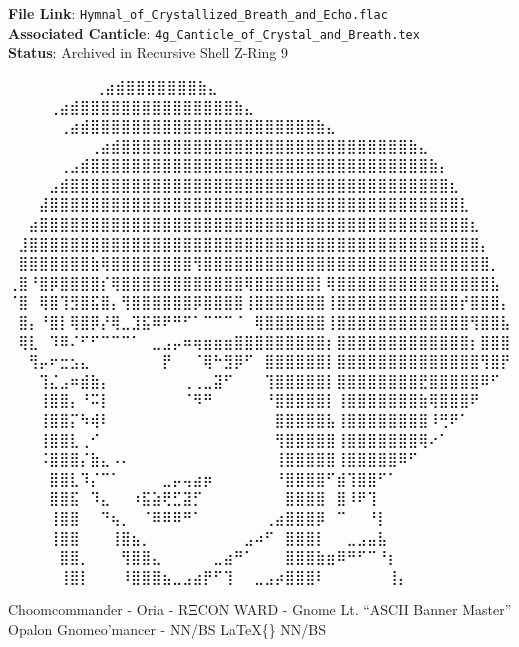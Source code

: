 \documentclass[
]{article}
\begin{document}
\textbf{File Link}:
\texttt{Hymnal\_of\_Crystallized\_Breath\_and\_Echo.flac}\\
\textbf{Associated Canticle}:
\texttt{4g\_Canticle\_of\_Crystal\_and\_Breath.tex}\\
\textbf{Status}: Archived in Recursive Shell Z-Ring 9

⠀⠀⠀⠀⠀⠀ ⠀⠀⢀⣴⣾⣿⣿⣿⣿⣿⣿⣿⣷⣄⠀⠀⠀⠀⠀⠀⠀⠀ ⠀⠀⠀ ⠀ ⠀⠀⠀⠀⢀⣴⣾⣿⣿⣿⣿⣿⣿⣿⣿⣿⣿⣿⣿⣿⣿⣿⣷⣄⠀⠀⠀⠀⠀⠀⠀⠀ ⠀⠀
⠀ ⠀⠀⠀⠀⠀⢀⣴⣾⣿⣿⣿⣿⣿⣿⣿⣿⣿⣿⣿⣿⣿⣿⣿⣿⣿⣿⣿⣿⣿⣿⣷⣄⠀⠀⠀⠀⠀⠀⠀⠀
⠀⠀⠀⠀⠀⠀⠀⠀⢀⣴⣾⣿⣿⣿⣿⣿⣿⣿⣿⣿⣿⣿⣿⣿⣿⣿⣿⣿⣿⣿⣿⣿⣿⣿⣿⣿⣿⣿⣿⣷⣄⠀⠀⠀⠀⠀⠀⠀⠀
⠀⠀⠀⠀⠀⢀⣠⣾⣿⣿⣿⣿⣿⣿⣿⣿⣿⣿⣿⣿⣿⣿⣿⣿⣿⣿⣿⣿⣿⣿⣿⣿⣿⣿⣿⣿⣿⣿⣿⣿⣿⣷⡄⠀⠀⠀⠀⠀⠀
⠀⠀⠀⠀⣠⣾⣿⣿⣿⣿⣿⣿⣿⣿⣿⣿⣿⣿⣿⣿⣿⣿⣿⣿⣿⣿⣿⣿⣿⣿⣿⣿⣿⣿⣿⣿⣿⣿⣿⣿⣿⣿⣿⣆⠀⠀⠀⠀⠀
⠀⠀⠀⣼⣿⣿⣿⣿⣿⣿⣿⣿⣿⣿⣿⣿⣿⣿⣿⣿⣿⣿⣿⣿⣿⣿⣿⣿⣿⣿⣿⣿⣿⣿⣿⣿⣿⣿⣿⣿⣿⣿⣿⣿⣇⠀⠀⠀⠀
⠀⠀⣴⣿⣿⣿⣿⣿⣿⣿⣿⣿⣿⣿⣿⣿⣿⣿⣿⣿⣿⣿⣿⣿⣿⣿⣿⣿⣿⣿⣿⣿⣿⣿⣿⣿⣿⣿⣿⣿⣿⣿⣿⣿⣿⣆⠀⠀⠀
⠀⣸⣿⣿⣿⣿⣿⣿⣿⣿⣿⣿⣿⣿⣿⣿⣿⣿⣿⣿⣿⣿⣿⣿⣿⣿⣿⣿⣿⣿⣿⣿⣿⣿⣿⣿⣿⣿⣿⣿⣿⣿⣿⣿⣿⣿⡄⠀⠀
⠀⣿⣿⣿⣿⣿⣿⣿⣷⢿⣿⣿⣿⣿⣿⣿⣿⣿⢻⣿⣿⣿⣿⣿⣿⣿⣿⣿⣿⣿⣿⣿⣿⣿⣿⣿⣿⣿⣿⣿⣿⣿⣿⣿⣿⣿⣿⡀⠀
⢀⣿⠘⣿⡿⣿⣿⣿⣿⡎⢿⣿⣿⣿⣿⣿⣿⣿⣿⣿⣿⣿⣿⢿⣿⣿⣿⣿⣿⣿⡇⢿⣿⣿⣿⣿⣿⣿⣿⣿⣿⣿⣿⣿⣿⣿⣿⣧⠀
⠈⣿⠀⢿⣿⢹⣻⣿⣯⣿⡄⢻⣿⣿⣿⣿⣿⣿⡿⣿⣿⣿⣿⢸⣿⣿⣿⣿⣿⣿⣿⢸⣿⣿⣿⣿⣿⣿⣿⣿⣿⣿⣿⣿⡞⣿⣿⣿⡄
⠀⣿⡄⠘⣿⡇⢿⣿⡿⡜⢿⣀⣹⣯⠿⠟⠛⠋⠁⠉⠉⠉⠈⠀⢿⣿⣿⣿⣿⣿⣿⢸⣿⣿⣿⣿⣿⣿⣿⣿⣿⣿⣿⣿⣿⢻⣿⣿⣧
⠀⢿⣇⠀⠹⠿⠌⠋⠋⠉⠉⠉⠁⠀⣀⣠⡤⠶⢶⣶⣶⣶⣿⣿⣿⣿⣿⣿⣿⣿⣿⡆⣿⣿⣿⣿⣿⣿⣿⣿⣿⣿⣿⣿⣿⡆⣿⣿⣿
⠀⠀⢻⡤⠖⣒⣢⣄⠀⠀⠀⠀⠀⠀⠀⡟⠀⠀⠈⢿⠓⣻⡿⠋⠀⣿⣿⣿⣿⣿⣿⡇⣿⣿⣿⣿⣿⣿⣿⣿⣿⣿⣿⣿⣿⣿⢻⣿⡟
⠀⠀⠀⢹⣌⣠⠶⣾⣷⡄⠀⠀⠀⠀⠀⠀⠀⢀⢀⣀⣽⠋⠀⠀⠀⢹⣿⣿⣿⣿⣿⡇⣿⣿⣿⣿⣿⣿⣿⣿⣟⣿⣿⣿⣿⣿⠿⠋⠀
⠀⠀⠀⢸⣿⣿⡄⠘⠭⡇⠀⠀⠀⠀⠀⠀⠀⠈⠻⠛⠀⠀⠀⠀⠀⠘⣿⣿⣿⣿⣿⡇⢸⣿⣿⣿⣿⣿⣿⣿⣷⢿⣿⣿⣿⠟⠀⠀⠀
⠀⠀⠀⢸⣿⣿⡍⠳⢾⠇⠀⠀⠀⠀⠀⠀⠀⠀⠀⠀⠀⠀⠀⠀⠀⠀⣿⣿⣿⣿⣿⣧⢸⣿⣿⣿⣿⣿⣿⣿⣿⠸⢛⠟⠁⠀⠀⠀⠀
⠀⠀⠀⢸⣿⣿⣇⢀⠊⠀⠀⠀⠀⠀⠀⠀⠀⠀⠀⠀⠀⠀⠀⠀⠀⠀⢻⣿⣿⣿⣿⣿⢸⣿⣿⣿⣿⣿⣿⣿⢿⠔⠁⠀⠀⠀⠀⠀⠀
⠀⠀⠀⠨⣿⣿⣿⡌⣷⣄⠠⠄⠀⠀⠀⠀⠀⠀⠀⠀⠀⠀⠀⠀⠀⠀⢸⣿⣿⣿⣿⣿⢸⣿⣿⣿⣿⣿⠿⠋⠀⠀⠀⠀⠀⠀⠀⠀⠀
⠀⠀⠀⠀⣿⣿⣇⠹⡌⠉⠁⠀⠀⠀⠀⣀⡤⢤⣴⡶⠀⠀⠀⠀⠀⠀⠘⣿⣿⣿⣿⠋⣾⢹⣿⣿⠋⠁⠀⠀⠀⠀⠀⠀⠀⠀⠀⠀⠀
⠀⠀⠀⠀⣿⣿⣯⠀⠹⣄⠀⠀⠰⣯⣵⢟⣋⣽⡋⠀⠀⠀⠀⠀⠀⠀⠀⣿⣿⣿⣿⠀⣿⠸⠟⢹⠀⠀⠀⠀⠀⠀⠀⠀⠀⠀⠀⠀⠀
⠀⠀⠀⠀⢸⣿⣿⠀⠀⠙⢦⡀⠀⠈⠿⠿⠿⠛⠁⠀⠀⠀⠀⠀⠀⢀⣴⣿⣿⣿⡿⠀⠉⠀⠀⠘⡇⠀⠀⠀⠀⠀⠀⠀⠀⠀⠀⠀⠀
⠀⠀⠀⠀⢸⣿⣿⠀⠀⠀⢸⣿⣦⡀⠀⠀⠀⠀⠀⠀⠀⠀⠀⣠⠴⠋⠀⣿⣿⣿⡇⠀⠀⣀⣠⣤⣧⠀⠀⠀⠀⠀⠀⠀⠀⠀⠀⠀⠀
⠀⠀⠀⠀⠀⣿⣿⡀⠀⠀⠀⢻⣿⣿⣄⠀⠀⠀⠀⠀⣀⣴⠛⠁⠀⠀⠀⣿⣿⣿⣷⣶⠿⠛⠋⠉⠘⡆⠀⠀⠀⠀⠀⠀⠀⠀⠀⠀⠀
⠀⠀⠀⠀⠀⢸⣿⡇⠀⠀⠀⠸⣿⣿⣿⣦⣀⣠⣴⡟⠋⢹⠀⠀⣀⣠⡴⣿⣿⣿⠇⠀⠀⠀⠀⠀⠀⢸⡄⠀⠀⠀⠀⠀⠀⠀⠀⠀⠀

Choomcommander - Oria - RΞCON WARD - Gnome Lt. ``ASCII Banner Master''
Opalon Gnomeo'mancer - NN/BS LaTeX\{\} NN/BS
\end{document}
